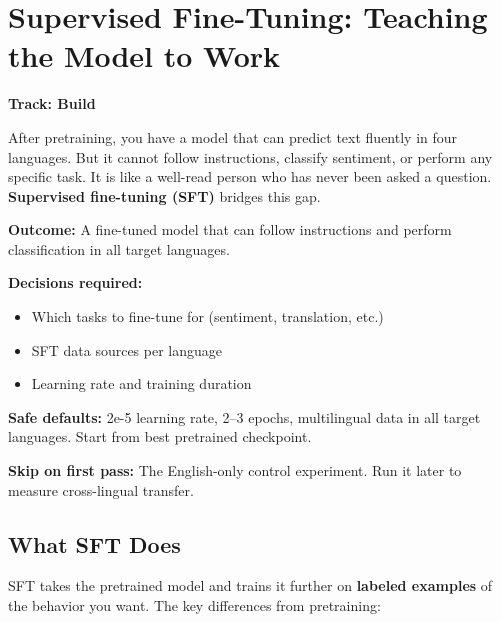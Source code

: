 \documentclass[11pt,a4paper]{article}
\begin{document}

\section{Supervised Fine-Tuning: Teaching the Model to Work}
\label{ch:sft}

\begin{center}
\colorbox{tipbg}{\textbf{Track: Build}}
\end{center}

After pretraining, you have a model that can predict text fluently in four languages. But it cannot follow instructions, classify sentiment, or perform any specific task. It is like a well-read person who has never been asked a question. \textbf{Supervised fine-tuning (SFT)} bridges this gap.

\begin{buildnow}
\textbf{Outcome:} A fine-tuned model that can follow instructions and perform classification in all target languages.

\textbf{Decisions required:}
\begin{itemize}[nosep]
  \item Which tasks to fine-tune for (sentiment, translation, etc.)
  \item SFT data sources per language
  \item Learning rate and training duration
\end{itemize}

\textbf{Safe defaults:} 2e-5 learning rate, 2--3 epochs, multilingual data in all target languages. Start from best pretrained checkpoint.

\textbf{Skip on first pass:} The English-only control experiment. Run it later to measure cross-lingual transfer.
\end{buildnow}

\subsection{What SFT Does}

SFT takes the pretrained model and trains it further on \textbf{labeled examples} of the behavior you want. The key differences from pretraining:
\end{document}
